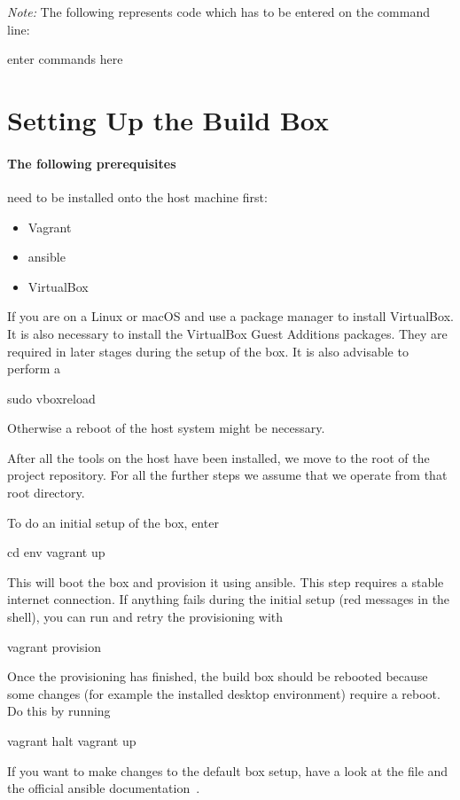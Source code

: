 \emph{Note:} The  following represents  code which  has to  be entered  on the
command line:
\begin{commandshell}
    enter commands here
\end{commandshell}

\section{Setting Up the Build Box} %
\label{sec:devguide:fpga_toolchain:buildbox}

\paragraph{The following  prerequisites} need  to be  installed onto  the host
machine first:
\begin{itemize}\tightlist
    \item Vagrant
    \item ansible
    \item VirtualBox
\end{itemize}
If  you  are on  a  Linux  or  macOS and  use  a  package manager  to  install
VirtualBox.  It  is also necessary  to install the VirtualBox  Guest Additions
packages.  They are required in later stages  during the setup of the box.  It
is also advisable to perform a
\begin{commandshell}
    sudo vboxreload
\end{commandshell}
\noindent Otherwise a reboot of the host system might be necessary.

After all the  tools on the host have  been installed, we move to  the root of
the project  repository. For all the further  steps we assume that  we operate
from that root directory.

To do an initial setup of the box, enter
\begin{commandshell}
    cd env
    vagrant up
\end{commandshell}
\noindent This  will boot the  box and  provision it using  ansible. This step
requires a  stable internet connection. If  anything fails during  the initial
setup (red messages in the shell), you can run and retry the provisioning with
\begin{commandshell}
    vagrant provision
\end{commandshell}

Once the provisioning  has finished, the build box should  be rebooted because
some  changes  (for  example  the installed  desktop  environment)  require  a
reboot. Do this by running
\begin{commandshell}
    vagrant halt
    vagrant up
\end{commandshell}
\noindent If you  want to make changes  to the default box setup,  have a look
at  the  file \newline\mbox{}  and  the
official ansible documentation~\cite{ansible-docs}.

